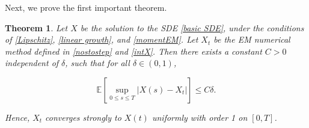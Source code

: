 \documentclass[10pt,reqno,final]{amsart}
\theoremstyle{plain}
\newtheorem{theorem}{Theorem}[section]
\theoremstyle{definition}
\theoremstyle{remark}
\numberwithin{equation}{section}
\numberwithin{figure}{section}
\numberwithin{table}{section}
\begin{document}
Next, we prove the first important theorem.
\begin{theorem}\label{main th EM1}
	Let $X$ be the solution to the SDE \textnormal{\cref{basic SDE}}, under the conditions of \textnormal{\cref{Lipschitz}}, \textnormal{\cref{linear growth}}, and \textnormal{\cref{momentEM}}.
	Let $X_t$ be the EM numerical method defined in \textnormal{\cref{nostostep}} and \textnormal{\cref{intX}}. Then there exists a constant $C > 0$ independent of $\delta$, such that for all $\delta \in (0,1)$,
	
	
	\[
	\mathbb{E} \left[ \sup_{0 \leq s \leq T} | X(s) - X_t | \right] \leq C \delta.
	\]
	
	
	Hence, $X_t$ converges strongly to $X(t)$ uniformly with order 1 on $[0, T]$.
\end{theorem}
\end{document}
